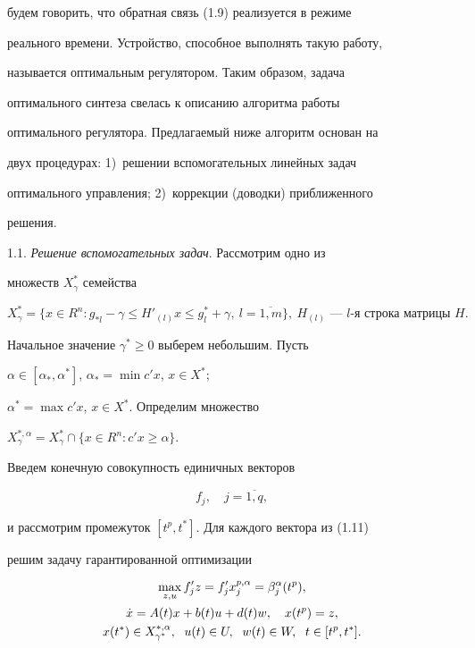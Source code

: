 будем говорить, что обратная связь (1.9) реализуется в режиме


реального времени. Устройство, способное выполнять такую работу,


называется оптимальным регулятором. Таким образом, задача


оптимального синтеза свелась к описанию алгоритма работы


оптимального регулятора. Предлагаемый ниже алгоритм основан на


двух процедурах: 1)~решении вспомогательных линейных задач


оптимального управления; 2)~коррекции (доводки) приближенного


решения.


\medskip





1.1. {\it Решение вспомогательных задач}. Рассмотрим одно из


множеств $X^*_{\gamma}$ семейства


$$


X_\gamma^*=\{x \in R^n:g_{*l}-\gamma \le H'_{(l)}x \le


g_l^*+\gamma,\ l=\overline{1,m}\},\ \text{$H_{(l)}$ --- $l$-я строка


матрицы $H$}.


$$


Начальное значение $\gamma^* \ge 0$ выберем небольшим. Пусть


$\alpha \in [\alpha_*, \alpha^*]$, $\alpha_*=\min c'x$, $x \in X^*$;


$\alpha^*=\max c'x$, $x \in X^*$. Определим множество


$X^{*,\alpha}_{\gamma}=X^*_{\gamma} \cap \{x \in R^n: c'x \ge


\alpha\}$.





Введем конечную совокупность единичных векторов


\begin{equation}


f_j,\quad j = \overline{1,q},


\end{equation}


и рассмотрим промежуток $[t^p,t^*]$. Для каждого вектора из (1.11)


решим задачу гарантированной оптимизации


\begin{gather}


\max_{z,u}f'_{j}z=f'_{j}x_{j}^{p,\alpha}=\beta_{j}^{\alpha}(t^p),\notag\\


%


\Dot x =A(t)x+b(t)u+d(t)w,\quad x(t^p)=z,\\


%


x(t^*)\in X_{\gamma^*}^{*,\alpha},\ \; u(t) \in U,\ \; w(t) \in W,


\ \; t \in [t^p, t^*].\notag


\end{gather}


